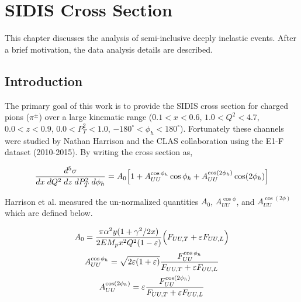 %
%

\chapter{SIDIS Cross Section}
This chapter discusses the analysis of semi-inclusive deeply inelastic events.  After a brief motivation, the data analysis details are described.  

\section{Introduction}
The primary goal of this work is to provide the SIDIS cross section for charged pions ($\pi^{\pm}$) over a large kinematic range ($0.1 < x < 0.6$, $1.0 < Q^2 < 4.7$, $0.0 < z < 0.9$, $0.0 < P_{T}^{2} < 1.0$, $-180^\circ < \phi_h < 180^\circ$).  Fortunately these channels were studied by Nathan Harrison and the CLAS collaboration \cite{theses-harrison:2015} using the E1-F dataset (2010-2015).  By writing the cross section as, 

\begin{equation}
	\frac{d^5\sigma}{dx \; dQ^2 \; dz \; dP_T^2 \; d\phi_h} = A_{0} \Bigl[ 1 + A_{UU}^{\cos\phi_h} \cos\phi_h + A_{UU}^{\cos(2\phi_h)} \cos(2\phi_h) \Bigr]
\end{equation}

Harrison et al. measured the un-normalized quantities $A_0$, $A_{UU}^{\cos\phi}$, and $A_{UU}^{\cos(2\phi)}$ which are defined below.  

\begin{gather}
	A_{0} = \frac{\pi \alpha^2 y (1+\gamma^2/2x)}{2 E M_p x^2 Q^2 (1-\varepsilon)} \Bigl( F_{UU,T} + \varepsilon F_{UU,L} \Bigr) \\
	A_{UU}^{\cos\phi_h} = \sqrt{2\varepsilon(1+\varepsilon)} \frac{F_{UU}^{\cos\phi_h}}{F_{UU,T} + \varepsilon F_{UU,L}} \\
	A_{UU}^{\cos(2\phi_h)} = \varepsilon \frac{F_{UU}^{\cos(2\phi_h)}}{F_{UU,T} + \varepsilon F_{UU,L}}
\end{gather}

